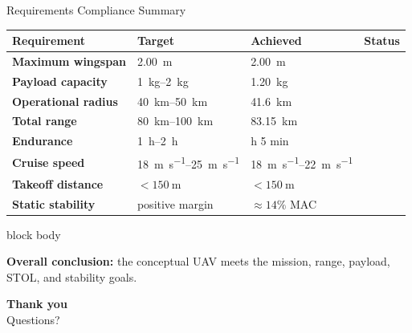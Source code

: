 \documentclass[aspectratio=169,11pt]{beamer}
\newcommand{\ok}{\textcolor{green!50!black}{\checkmark}}
\begin{document}
\begin{frame}[t]{Requirements Compliance Summary}
\small
\renewcommand{\arraystretch}{1.12}
\begin{tabularx}{\textwidth}{@{}>{\bfseries}X >{\centering\arraybackslash}p{2.3cm} >{\centering\arraybackslash}p{2.7cm} >{\centering\arraybackslash}p{0.9cm}@{}}
\toprule
Requirement & Target & Achieved & Status \\
\midrule
Maximum wingspan & \SI{2.00}{\meter} & \SI{2.00}{\meter} & \ok \\
Payload capacity & \SIrange{1}{2}{\kilo\gram} & \SI{1.20}{\kilo\gram} & \ok \\
Operational radius & \SIrange{40}{50}{\kilo\meter} & \SI{41.6}{\kilo\meter} & \ok \\
Total range & \SIrange{80}{100}{\kilo\meter} & \SI{83.15}{\kilo\meter} & \ok \\
Endurance & \SIrange{1}{2}{\hour} & 2 h 5 min & \ok \\
Cruise speed & \SIrange{18}{25}{\meter\per\second} & \SIrange{18}{22}{\meter\per\second} & \ok \\
Takeoff distance & $<\SI{150}{\meter}$ & $<\SI{150}{\meter}$ & \ok \\
Static stability & positive margin & \(\approx 14\%\) MAC & \ok \\
\bottomrule
\end{tabularx}

\vspace{0.3em}
\begin{center}
\begin{beamercolorbox}[rounded=true,shadow=true,wd=0.84\textwidth,center,sep=0.55em]{block body}
\small\parbox{0.76\textwidth}{\centering\textcolor{navymain}{\textbf{Overall conclusion:}} the conceptual UAV meets the mission, range, payload, STOL, and stability goals.}
\end{beamercolorbox}
\end{center}
\end{frame}

\begin{frame}[plain]
\vfill
\begin{center}
{\fontsize{20}{24}\selectfont\bfseries Thank you}\\[0.2cm]
{\large Questions?}
\end{center}
\vfill
\end{frame}
\end{document}
